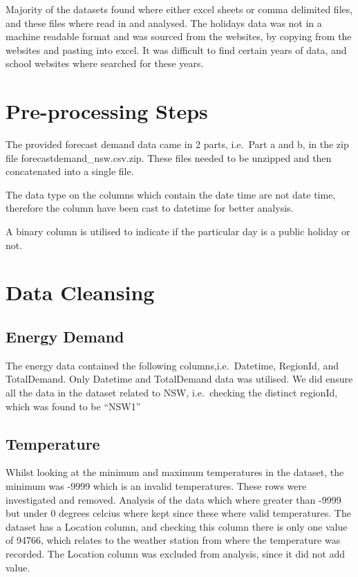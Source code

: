 \documentclass[mstat,12pt]{unswthesis}
\begin{document}
Majority of the datasets found where either excel sheets or comma
delimited files, and these files where read in and analysed. The
holidays data was not in a machine readable format and was sourced from
the websites, by copying from the websites and pasting into excel. It
was difficult to find certain years of data, and school websites where
searched for these years.

\hypertarget{pre-processing-steps}{%
\section{Pre-processing Steps}\label{pre-processing-steps}}

The provided forecast demand data came in 2 parts, i.e.~Part a and b, in
the zip file forecastdemand\_nsw.csv.zip. These files needed to be
unzipped and then concatenated into a single file.

The data type on the columns which contain the date time are not date
time, therefore the column have been cast to datetime for better
analysis.

A binary column is utilised to indicate if the particular day is a
public holiday or not.

\hypertarget{data-cleansing}{%
\section{Data Cleansing}\label{data-cleansing}}

\hypertarget{energy-demand}{%
\subsection{Energy Demand}\label{energy-demand}}

The energy data contained the following columns,i.e.~Datetime, RegionId,
and TotalDemand. Only Datetime and TotalDemand data was utilised. We did
ensure all the data in the dataset related to NSW, i.e.~checking the
distinct regionId, which was found to be ``NSW1''

\hypertarget{temperature}{%
\subsection{Temperature}\label{temperature}}

Whilst looking at the minimum and maximum temperatures in the dataset,
the minimum was -9999 which is an invalid temperatures. These rows were
investigated and removed. Analysis of the data which where greater than
-9999 but under 0 degrees celcius where kept since these where valid
temperatures. The dataset has a Location column, and checking this
column there is only one value of 94766, which relates to the weather
station from where the temperature was recorded. The Location column was
excluded from analysis, since it did not add value.
\end{document}
